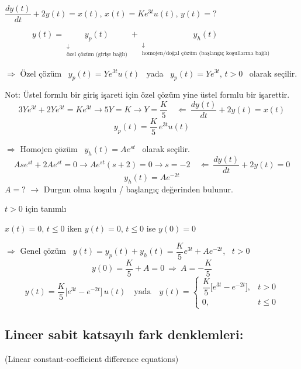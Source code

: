 \documentclass[11pt,a4paper]{article}
\begin{document}
\begin{ornek}[(Ex)]
$\dfrac{dy(t)}{dt} + 2y(t) = x(t)$, \quad $x(t) = K e^{3t}u(t)$, \quad $y(t) = ?$
\end{ornek}
\begin{cozum}
\[ y(t) = \underset{\substack{\downarrow\\ \text{özel çözüm (girişe bağlı)}}}{y_p(t)} + \underset{\substack{\downarrow\\ \text{homojen/doğal çözüm (başlangıç koşullarına bağlı)}}}{y_h(t)} \]

$\Rightarrow$ Özel çözüm \ $y_p(t) = Y e^{3t}u(t)$ \ yada \ $y_p(t) = Y e^{3t}$, $t > 0$ \ olarak seçilir.

Not: Üstel formlu bir giriş işareti için özel çözüm yine üstel formlu bir işarettir.
\[ 3Y e^{3t} + 2Y e^{3t} = K e^{3t} \longrightarrow 5Y = K \rightarrow Y = \frac{K}{5} \quad \Longleftarrow \ \frac{dy(t)}{dt} + 2y(t) = x(t) \]
\[ y_p(t) = \frac{K}{5}\,e^{3t}u(t) \]

$\Rightarrow$ Homojen çözüm \ $y_h(t) = A e^{st}$ \ olarak seçilir.
\[ A s e^{st} + 2A e^{st} = 0 \longrightarrow A e^{st}(s+2) = 0 \longrightarrow s = -2 \quad \Longleftarrow \ \frac{dy(t)}{dt} + 2y(t) = 0 \]
\[ y_h(t) = A e^{-2t} \]
$A = ?$ $\rightarrow$ Durgun olma koşulu / başlangıç değerinden bulunur.

$t > 0$ için tanımlı

$x(t) = 0$, $t \leq 0$ iken $y(t) = 0$, $t \leq 0$ ise $y(0) = 0$

$\Rightarrow$ Genel çözüm \ $y(t) = y_p(t) + y_h(t) = \dfrac{K}{5}e^{3t} + A e^{-2t}$, \ $t > 0$
\[ y(0) = \frac{K}{5} + A = 0 \ \Rightarrow\ A = -\frac{K}{5} \]
\[ y(t) = \frac{K}{5}\bigl[e^{3t} - e^{-2t}\bigr]\,u(t) \quad \text{yada} \quad y(t) = \begin{cases} \dfrac{K}{5}\bigl[e^{3t} - e^{-2t}\bigr], & t > 0 \\[2mm] 0, & t \leq 0 \end{cases} \]
\end{cozum}

\subsection{Lineer sabit katsayılı fark denklemleri:}
(Linear constant-coefficient difference equations)
\end{document}

